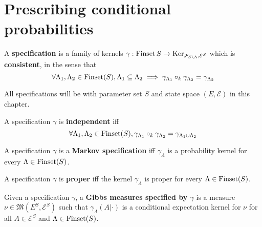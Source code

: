 \section{Prescribing conditional probabilities}

\begin{definition}[Specification]
    \label{def:spec}
    \leanok{}

    A {\bf specification} is a family of kernels $\gamma : \operatorname{Finset} S \to \operatorname{Ker}_{\mathcal{F}_{S\setminus\Lambda}, \mathcal{E}^S}$ which is {\bf consistent}, in the sense that
    \[\forall \Lambda_1, \Lambda_2 \in \operatorname{Finset}(S), \Lambda_1 \subseteq \Lambda_2 \implies \gamma_{\Lambda_1} \circ_k \gamma_{\Lambda_2} = \gamma_{\Lambda_2}\]
\end{definition}

All specifications will be with parameter set $S$ and state space $(E, \mathcal{E})$ in this chapter.

\begin{definition}
    \label{def:indep-spec}
    \leanok{}

    A specification $\gamma$ is \textbf{independent} iff
    \[\forall \Lambda_1, \Lambda_2 \in \operatorname{Finset}(S), \gamma_{\Lambda_1} \circ_k \gamma_{\Lambda_2} = \gamma_{\Lambda_1\cup\Lambda_2}\]
\end{definition}

\begin{definition}
    \label{def:markov-spec}
    \leanok{}

    A specification $\gamma$ is a \textbf{Markov specification} iff $\gamma_\Lambda$ is a probability kernel for every $\Lambda \in \operatorname{Finset}(S)$.
\end{definition}

\begin{definition}
    \label{def:proper-spec}
    \leanok{}

    A specification $\gamma$ is \textbf{proper} iff the kernel $\gamma_\Lambda$ is proper for every $\Lambda \in \operatorname{Finset}(S)$.
\end{definition}

\begin{definition}
    \label{def:gibbs-meas}
    \leanok
    Given a specification $\gamma$, a \textbf{Gibbs measures specified by $\gamma$} is a measure $\nu \in \mathfrak{M}(E^S, \mathcal{E}^S)$ such that $\gamma_\Lambda(A|\cdot)$ is a conditional expectation kernel for $\nu$ for all $A \in \mathcal E^S$ and $\Lambda \in \operatorname{Finset}(S)$.
\end{definition}

